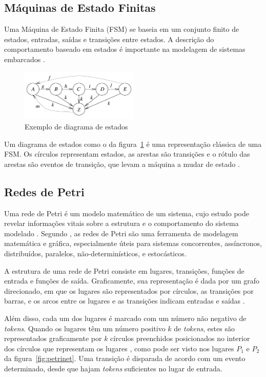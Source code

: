 \subsection{Máquinas de Estado Finitas}
Uma Máquina de Estado Finita (FSM) se baseia em um conjunto finito de estados, entradas, saídas e transições entre estados. A descrição do comportamento baseado em estados é importante na modelagem de sistemas embarcados \cite{marwedel:2010}.

\begin{figure}[h]
	\caption{\label{fig:fsm}Exemplo de diagrama de estados}
	\begin{center}
	    \includegraphics[width=0.5\textwidth]{resources/fsm_marwedel}
	\end{center}
\end{figure}

Um diagrama de estados como o da figura~\ref{fig:fsm} é uma representação clássica de uma FSM. Os círculos representam estados, as arestas são transições e o rótulo das arestas são eventos de transição, que levam a máquina a mudar de estado \cite{marwedel:2010}.

\subsection{Redes de Petri}
Uma rede de Petri é um modelo matemático de um sistema, cujo estudo pode revelar informações vitais sobre a estrutura e o comportamento do sistema modelado \cite{peterson:1981}. Segundo , as redes de Petri são uma ferramenta de modelagem matemática e gráfica, especialmente úteis para sistemas concorrentes, assíncronos, distribuídos, paralelos, não-determinísticos, e estocásticos.

A estrutura de uma rede de Petri consiste em lugares, transições, funções de entrada e funções de saída. Graficamente, sua representação é dada por um grafo direcionado, em que os lugares são representados por círculos, as transições por barras, e os arcos entre os lugares e as transições indicam entradas e saídas \cite{peterson:1981}. %

Além disso, cada um dos lugares é marcado com um número não negativo de \textit{tokens}. Quando os lugares têm um número positivo $k$ de \textit{tokens}, estes são representados graficamente por $k$ círculos preenchidos posicionados no interior dos círculos que representam os lugares \cite{murata:1989}, como pode ser visto nos lugares $P_1$ e $P_2$ da figura~\ref{fig:petrinet}. Uma transição é disparada de acordo com um evento determinado, desde que hajam \textit{tokens} suficientes no lugar de entrada.

